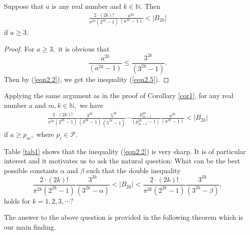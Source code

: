 \documentclass[eqnumis, pdf]{yjb}
\begin{document}
\begin{corollary}\label{cor1}
Suppose that $ a $ is any real number and $ k \in \mathbb{N}. $ Then 
\begin{align}\label{eqn2.5}
\frac{2 \cdot (2k)!}{\pi^{2k} (2^{2k} - 1)} \frac{a^{2k}}{(a^{2k}-1)} < \vert B_{2k} \vert
\end{align}
if $ a \geq 3.$
\end{corollary}
\begin{proof}
For $ a \geq 3, $ it is obvious that
$$ \frac{a^{2k}}{(a^{2k}-1)} \leq \frac{3^{2k}}{(3^{2k}-1)}. $$ Then by (\ref{eqn2.2}), we get the inequality (\ref{eqn2.5}).
\end{proof}
\begin{remark}
Applying the same argument as in the proof of Corollary \ref{cor1}, for any real number $ a $ and $ m, k \in \mathbb{N}, $ we have 
\begin{align}\label{eqn2.6}
\frac{2 \cdot (2k)!}{\pi^{2k}(2^{2k}-1)}\frac{3^{2k}}{(3^{2k}-1)}\frac{5^{2k}}{(5^{2k}-1)} \cdots \frac{p_{m-1}^{2k}}{(p_{m-1}^{2k}-1)} \frac{a^{2k}}{(a^{2k}-1)} < \vert B_{2k} \vert
\end{align}
if $ a \geq p_m, $ where $ p_i \in \mathcal{P}.$
\end{remark}
Table \ref{tab1} shows that the inequality (\ref{eqn2.2}) is very sharp. It is of particular interest and it motivates us to ask the natural question: What can be the best possible constants $ \alpha $ and $ \beta $ such that the double inequality 
$$ \frac{2\cdot (2k)!}{\pi^{2k} (2^{2k}-1)}\frac{3^{2k}}{(3^{2k}-\alpha)} < \vert B_{2k} \vert < \frac{2\cdot (2k)!}{\pi^{2k} (2^{2k}-1)}\frac{3^{2k}}{(3^{2k}-\beta)}, $$
holds for $ k = 1, 2, 3, \cdots?$

The answer to the above question is provided in the following theorem which is our main finding.
\end{document}
